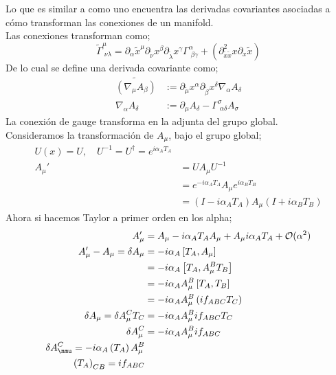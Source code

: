 \documentclass[../main.tex]{subfiles}
\begin{document}
 Lo que es similar a como uno encuentra las derivadas covariantes asociadas a cómo transforman las conexiones de un manifold. \\
 Las conexiones transforman como;
 \begin{equation}
   \tilde{\Gamma}_{\;\nu \lambda}^{\mu } = \partial_\alpha \tilde{x}^\mu \partial_{\tilde{\nu}}x^\beta \partial_{\tilde{\lambda}}x^\gamma \Gamma^\alpha_{\; \beta\gamma} + \left( \partial^2_{\tilde{x}\tilde{x}} x \partial_x\tilde{x} \right)
  \end{equation}
  De lo cual se define una derivada covariante como;
  \begin{align*}
    \tilde{\left( \nabla_\mu A_\beta \right)}& := \partial_{\tilde{\mu}}x^\alpha \partial_{\tilde{\beta}}x^\delta \nabla_\alpha A_\delta \\
    \nabla_\alpha A_\delta & := \partial_\mu A_\delta - \Gamma^\sigma_{\;\alpha \delta}A_\sigma
  \end{align*}
  La conexión de gauge transforma en la adjunta del grupo global.
 \\
 Consideramos la transformación de $A_\mu$, bajo el grupo global;
 \begin{align*}
   U(x) = U ,\quad U^{-1} = U^\dagger = e^{i\alpha_AT_A} \\
   A_\mu'& = UA_\mu U^{-1} \\
   & = e^{-i\alpha_AT_A} A_\mu e^{i\alpha_BT_B} \\
   & = \left( I -i\alpha_AT_A \right)A_\mu \left( I + i\alpha_B T_B \right)
 \end{align*}
 Ahora si hacemos Taylor a primer orden en los alpha;
 \begin{align*}
   A_\mu'& = A_\mu - i\alpha_AT_A A_\mu + A_\mu i\alpha_AT_A + \mathcal{O}(\alpha^2)\\
   A_\mu'-A_\mu  = \delta A_\mu & = -i\alpha_A \left[ T_A,A_\mu \right]\\
   &  = -i\alpha_A \left[ T_A, A^B_\mu T_B \right] \\
   & = -i\alpha_A A^B_\mu \left[ T_A,T_B \right] \\
   & = -i\alpha_AA_\mu^B \left( if_{ABC} T_C \right) \\
   \delta A_\mu = \delta A_\mu^C T_C & = -i\alpha_A A^B_\mu i f_{ABC} T_C \\
   \delta A^C_\mu & = -i\alpha_A A^B_\mu if_{ABC} \\
   \delta A^C_\nmu = -i\alpha_A \left( T_A \right) A^B_\mu \\
   \left( T_A \right)_{CB} = if_{ABC}
 \end{align*}
\end{document}
